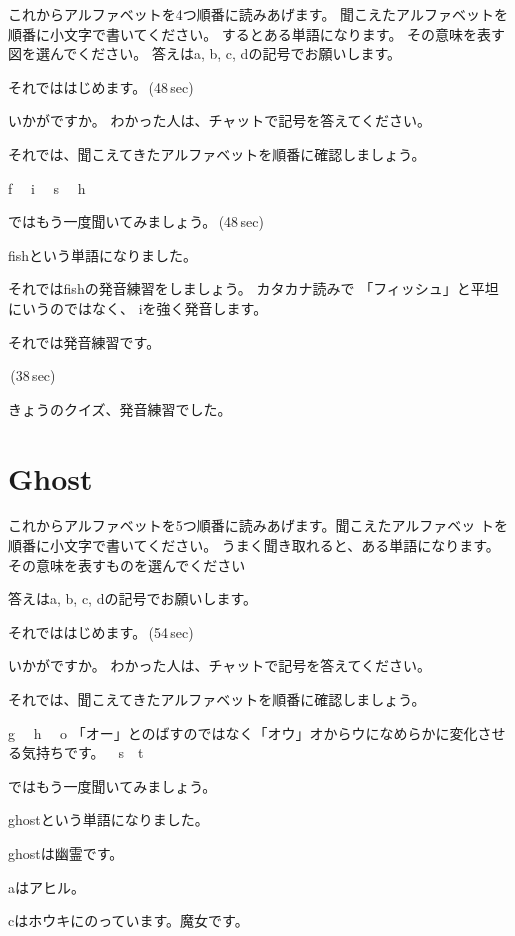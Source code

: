 \documentclass[12pt]{jlreq}
\newcommand{\myMouse}{%
  {\large \ComputerMouse}
}
\begin{document}
これからアルファベットを4つ順番に読みあげます。
聞こえたアルファベットを順番に小文字で書いてください。
するとある単語になります。
その意味を表す図を選んでください。
答えはa, b, c, dの記号でお願いします。

それでははじめます。\faVolumeUp\,(48\,sec)

いかがですか。
わかった人は、チャットで記号を答えてください。

それでは、聞こえてきたアルファベットを順番に確認しましょう。{\large \ComputerMouse}

f\,\,
{\large \ComputerMouse}\,\,
i\,\,
{\large \ComputerMouse}\,\,
s\,\,
{\large \ComputerMouse}\,\,
h

ではもう一度聞いてみましょう。\faVolumeUp\,(48\,sec)

fishという単語になりました。

それではfishの発音練習をしましょう。
カタカナ読みで
「フィッシュ」と平坦にいうのではなく、
iを強く発音します。

それでは発音練習です。

\faVolumeUp\,(38\,sec)

きょうのクイズ、発音練習でした。
\section{Ghost}

これからアルファベットを5つ順番に読みあげます。聞こえたアルファベッ
トを順番に小文字で書いてください。
うまく聞き取れると、ある単語になります。
その意味を表すものを選んでください

答えはa, b, c, dの記号でお願いします。

それでははじめます。\faVolumeUp\,(54\,sec)

いかがですか。
わかった人は、チャットで記号を答えてください。

それでは、聞こえてきたアルファベットを順番に確認しましょう。{\large \ComputerMouse}

g\,\,
{\large \ComputerMouse}\,\,
h\,\,
{\large \ComputerMouse}\,\,
o\,\,「オー」とのばすのではなく「オウ」オからウになめらかに変化させる気持ちです。
{\large \ComputerMouse}\,\,
s
\myMouse\,\,
t

ではもう一度聞いてみましょう。


ghostという単語になりました。

ghostは幽霊です。

aはアヒル。

cはホウキにのっています。魔女です。
\end{document}

